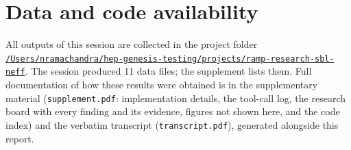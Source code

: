 \documentclass[11pt,a4paper]{article}
\begin{document}
\section*{Data and code availability}
All outputs of this session are collected in the project folder \href{file:///Users/nramachandra/hep-genesis-testing/projects/ramp-research-sbl-neff}{\texttt{/\allowbreak{}Users/\allowbreak{}nramachandra/\allowbreak{}hep-genesis-testing/\allowbreak{}projects/\allowbreak{}ramp-research-sbl-neff}}.
The session produced 11 data files; the supplement lists them.
Full documentation of how these results were obtained is in the supplementary material (\texttt{supplement.pdf}: implementation details, the tool-call log, the research board with every finding and its evidence, figures not shown here, and the code index) and the verbatim transcript (\texttt{transcript.pdf}), generated alongside this report.
\end{document}
